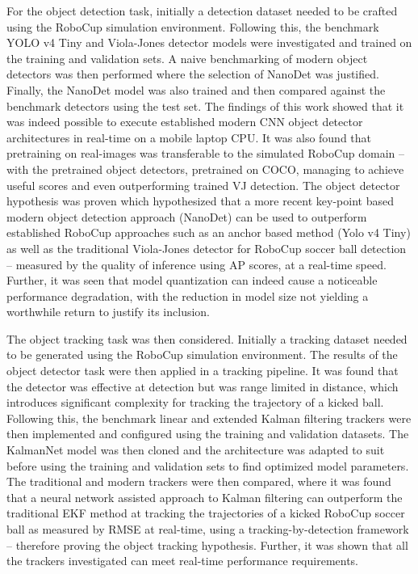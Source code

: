 \documentclass[a4paper,twoside,12pt]{report}
\begin{document}
For the object detection task, initially a detection dataset needed to be crafted using the RoboCup simulation environment. Following this, the benchmark YOLO v4 Tiny and Viola-Jones detector models were investigated and trained on the training and validation sets. A naive benchmarking of modern object detectors was then performed where the selection of NanoDet was justified. Finally, the NanoDet model was also trained and then compared against the benchmark detectors using the test set. The findings of this work showed that it was indeed possible to execute established modern CNN object detector architectures in real-time on a mobile laptop CPU. It was also found that pretraining on real-images was transferable to the simulated RoboCup domain -- with the pretrained object detectors, pretrained on COCO, managing to achieve useful scores and even outperforming trained VJ detection. The object detector hypothesis was proven which hypothesized that a more recent key-point based modern object detection approach (NanoDet) can be used to outperform established RoboCup approaches such as an anchor based method (Yolo v4 Tiny) as well as the traditional Viola-Jones detector for RoboCup soccer ball detection -- measured by the quality of inference using AP scores, at a real-time speed. Further, it was seen that model quantization can indeed cause a noticeable performance degradation, with the reduction in model size not yielding a worthwhile return to justify its inclusion. 

The object tracking task was then considered. Initially a tracking dataset needed to be generated using the RoboCup simulation environment. The results of the object detector task were then applied in a tracking pipeline. It was found that the detector was effective at detection but was range limited in distance, which introduces significant complexity for tracking the trajectory of a kicked ball. Following this, the benchmark linear and extended Kalman filtering trackers were then implemented and configured using the training and validation datasets. The KalmanNet model was then cloned and the architecture was adapted to suit before using the training and validation sets to find optimized model parameters. The traditional and modern trackers were then compared, where it was found that a neural network assisted approach to Kalman filtering can outperform the traditional EKF method at tracking the trajectories of a kicked RoboCup soccer ball as measured by RMSE at real-time, using a tracking-by-detection framework -- therefore proving the object tracking hypothesis. Further, it was shown that all the trackers investigated can meet real-time performance requirements.
\end{document}
